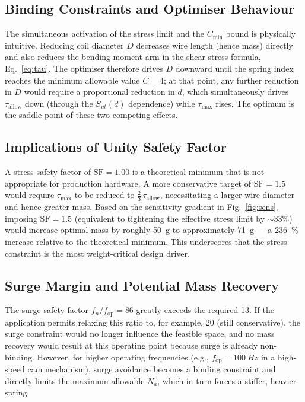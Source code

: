 \documentclass[10pt,twocolumn]{article}
\begin{document}
\subsection{Binding Constraints and Optimiser Behaviour}

The simultaneous activation of the stress limit and the $C_{\min}$ bound is
physically intuitive.
Reducing coil diameter $D$ decreases wire length (hence mass) directly and
also reduces the bending-moment arm in the shear-stress formula, Eq.~\eqref{eq:tau}.
The optimiser therefore drives $D$ downward until the spring index reaches the
minimum allowable value $C = 4$; at that point, any further reduction in $D$
would require a proportional reduction in $d$, which simultaneously drives
$\tau_{\text{allow}}$ down (through the $S_{ut}(d)$ dependence) while
$\tau_{\max}$ rises.
The optimum is the saddle point of these two competing effects.

\subsection{Implications of Unity Safety Factor}

A stress safety factor of $\text{SF} = 1.00$ is a theoretical minimum that
is not appropriate for production hardware.
A more conservative target of $\text{SF} = 1.5$ would require $\tau_{\max}$
to be reduced to $\tfrac{2}{3}\,\tau_{\text{allow}}$, necessitating a larger
wire diameter and hence greater mass.
Based on the sensitivity gradient in Fig.~\ref{fig:sens}, imposing $\text{SF}
= 1.5$ (equivalent to tightening the effective stress limit by $\sim\!33\%$)
would increase optimal mass by roughly \SI{50}{g} to approximately \SI{71}{g}
--- a \SI{236}{\percent} increase relative to the theoretical minimum.
This underscores that the stress constraint is the most weight-critical
design driver.

\subsection{Surge Margin and Potential Mass Recovery}

The surge safety factor $f_n / f_{\text{op}} = 86$ greatly exceeds the
required 13.
If the application permits relaxing this ratio to, for example, 20
(still conservative), the surge constraint would no longer influence the
feasible space, and no mass recovery would result at this operating point
because surge is already non-binding.
However, for higher operating frequencies (e.g., $f_{\text{op}} = \SI{100}{Hz}$
in a high-speed cam mechanism), surge avoidance becomes a binding constraint
and directly limits the maximum allowable $N_a$, which in turn forces a stiffer,
heavier spring.
\end{document}
